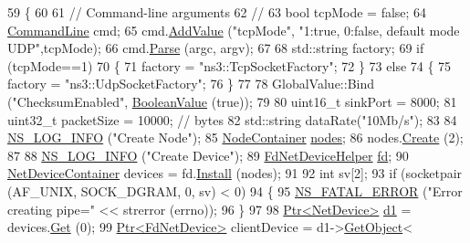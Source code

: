 \begin{DoxyCode}
59 \{
60 
61   \textcolor{comment}{// Command-line arguments}
62   \textcolor{comment}{//}
63   \textcolor{keywordtype}{bool} tcpMode = \textcolor{keyword}{false};
64   \hyperlink{classns3_1_1CommandLine}{CommandLine} cmd;
65   cmd.\hyperlink{classns3_1_1CommandLine_addcfb546c7ad4c8bd0965654d55beb8e}{AddValue} (\textcolor{stringliteral}{"tcpMode"}, \textcolor{stringliteral}{"1:true, 0:false, default mode UDP"},tcpMode);
66   cmd.\hyperlink{classns3_1_1CommandLine_a5c10b85b3207e5ecb48d907966923156}{Parse} (argc, argv);
67    
68   std::string factory;
69   \textcolor{keywordflow}{if} (tcpMode==1)
70     \{
71       factory = \textcolor{stringliteral}{"ns3::TcpSocketFactory"};
72     \}
73   \textcolor{keywordflow}{else}
74     \{
75       factory = \textcolor{stringliteral}{"ns3::UdpSocketFactory"};
76     \}
77 
78   GlobalValue::Bind (\textcolor{stringliteral}{"ChecksumEnabled"}, \hyperlink{classns3_1_1BooleanValue}{BooleanValue} (\textcolor{keyword}{true}));
79 
80   uint16\_t sinkPort = 8000;
81   uint32\_t packetSize = 10000; \textcolor{comment}{// bytes}
82   std::string dataRate(\textcolor{stringliteral}{"10Mb/s"});
83 
84   \hyperlink{group__logging_gafbd73ee2cf9f26b319f49086d8e860fb}{NS\_LOG\_INFO} (\textcolor{stringliteral}{"Create Node"});
85   \hyperlink{classns3_1_1NodeContainer}{NodeContainer} \hyperlink{visualizer-ideas_8txt_a3e1b3808014a2c68ab0cd0182e041be2}{nodes};
86   nodes.\hyperlink{classns3_1_1NodeContainer_a787f059e2813e8b951cc6914d11dfe69}{Create} (2);
87 
88   \hyperlink{group__logging_gafbd73ee2cf9f26b319f49086d8e860fb}{NS\_LOG\_INFO} (\textcolor{stringliteral}{"Create Device"});
89   \hyperlink{classns3_1_1FdNetDeviceHelper}{FdNetDeviceHelper} \hyperlink{lte_2model_2fading-traces_2fading__trace__generator_8m_a44f21d5190b5a6df8089f54799628d7e}{fd};
90   \hyperlink{classns3_1_1NetDeviceContainer}{NetDeviceContainer} devices = fd.\hyperlink{classns3_1_1FdNetDeviceHelper_af70d55cbb4f6411c33cacb84eb651ad5}{Install} (nodes);
91 
92   \textcolor{keywordtype}{int} sv[2];
93   \textcolor{keywordflow}{if} (socketpair (AF\_UNIX, SOCK\_DGRAM, 0, sv) < 0)
94     \{
95       \hyperlink{group__fatal_ga5131d5e3f75d7d4cbfd706ac456fdc85}{NS\_FATAL\_ERROR} (\textcolor{stringliteral}{"Error creating pipe="} << strerror (errno));
96     \}
97 
98   \hyperlink{classns3_1_1Ptr}{Ptr<NetDevice>} \hyperlink{lte__link__budget__interference_8m_ab5ca0c44c6f0a063a5219b3749db661f}{d1} = devices.\hyperlink{classns3_1_1NetDeviceContainer_a677d62594b5c9d2dea155cc5045f4d0b}{Get} (0);
99   \hyperlink{classns3_1_1Ptr}{Ptr<FdNetDevice>} clientDevice = d1->\hyperlink{classns3_1_1Object_a13e18c00017096c8381eb651d5bd0783}{GetObject}<

\end{DoxyCode}
